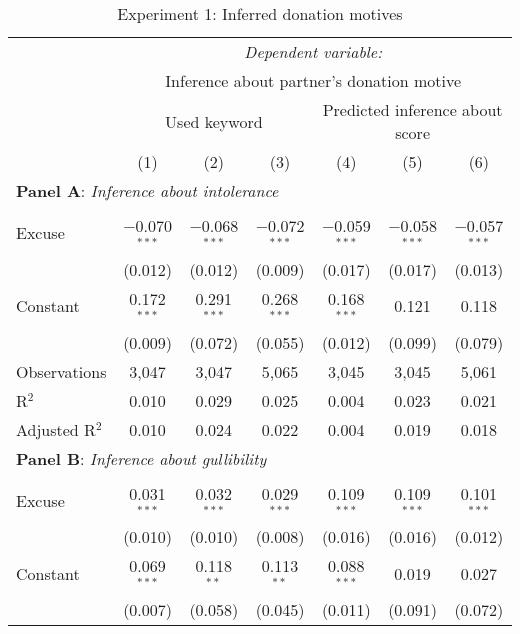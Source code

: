 \begin{table}[!htbp] \centering 
  \caption{Experiment 1: Inferred donation motives}
  \label{t:1-word}
\begin{threeparttable}
\begin{tabular}{@{\hspace{5pt}}l@{\hspace{5pt}}cccccc} 
\toprule 
 & \multicolumn{6}{c}{\textit{Dependent variable:}} \\ 
\cmidrule(rr){2-7} 
 & \multicolumn{6}{c}{Inference about partner's donation motive} \\ 
\cmidrule(lr){2-4} \cmidrule(lr){5-7}
 & \multicolumn{3}{c}{Used keyword} & \multicolumn{3}{c}{Predicted inference about score} \\ 
 & (1) & (2) & (3) & (4) & (5) & (6)\\ 
\midrule  
\midrule
\multicolumn{7}{l}{\textbf{Panel A}: \textit{Inference about intolerance}} \\
\midrule
\\[-2.1ex] Excuse & $-$0.070$^{***}$ & $-$0.068$^{***}$ & $-$0.072$^{***}$ & $-$0.059$^{***}$ & $-$0.058$^{***}$ & $-$0.057$^{***}$ \\ 
  & (0.012) & (0.012) & (0.009) & (0.017) & (0.017) & (0.013) \\ 
 \addlinespace 
 Constant & 0.172$^{***}$ & 0.291$^{***}$ & 0.268$^{***}$ & 0.168$^{***}$ & 0.121 & 0.118 \\ 
  & (0.009) & (0.072) & (0.055) & (0.012) & (0.099) & (0.079) \\ 
 \addlinespace 
\midrule  
Observations & 3,047 & 3,047 & 5,065 & 3,045 & 3,045 & 5,061 \\ 
R$^{2}$ & 0.010 & 0.029 & 0.025 & 0.004 & 0.023 & 0.021 \\ 
Adjusted R$^{2}$ & 0.010 & 0.024 & 0.022 & 0.004 & 0.019 & 0.018 \\ 
\midrule
\multicolumn{7}{l}{\textbf{Panel B}: \textit{Inference about gullibility}} \\
\midrule
\\[-2.1ex] Excuse & 0.031$^{***}$ & 0.032$^{***}$ & 0.029$^{***}$ & 0.109$^{***}$ & 0.109$^{***}$ & 0.101$^{***}$ \\ 
  & (0.010) & (0.010) & (0.008) & (0.016) & (0.016) & (0.012) \\ 
 \addlinespace 
 Constant & 0.069$^{***}$ & 0.118$^{**}$ & 0.113$^{**}$ & 0.088$^{***}$ & 0.019 & 0.027 \\ 
  & (0.007) & (0.058) & (0.045) & (0.011) & (0.091) & (0.072) \\ 

\end{tabular}
\end{threeparttable}
\end{table}

